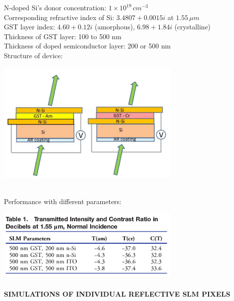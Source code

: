 \documentclass[]{article}
\let\oldparagraph\paragraph
\renewcommand{\paragraph}[1]{\oldparagraph{#1}\mbox{}}
\begin{document}
N-doped Si's donor concentration: \(1 \times 10^{19} \,cm^{-3}\)\\
Corresponding refractive index of Si: \(3.4807 + 0.0015i\) at
\(1.55\,\mu m\)\\
GST layer index: \(4.60 + 0.12i\) (amorphous), \(6.98 + 1.84i\)
(crystalline)\\
Thickness of GST layer: 100 to 500 nm\\
Thickness of doped semiconductor layer: 200 or 500 nm\\
\newpage
Structure of device:\\
\centerline{\includegraphics[width = 9cm]{image/002_01.png}}\\
Performance with different parameters:\\
\centerline{\includegraphics[width = 9cm]{image/002_02.png}}

\paragraph{SIMULATIONS OF INDIVIDUAL REFLECTIVE SLM
PIXELS}\label{simulations-of-individual-reflective-slm-pixels}
\end{document}
